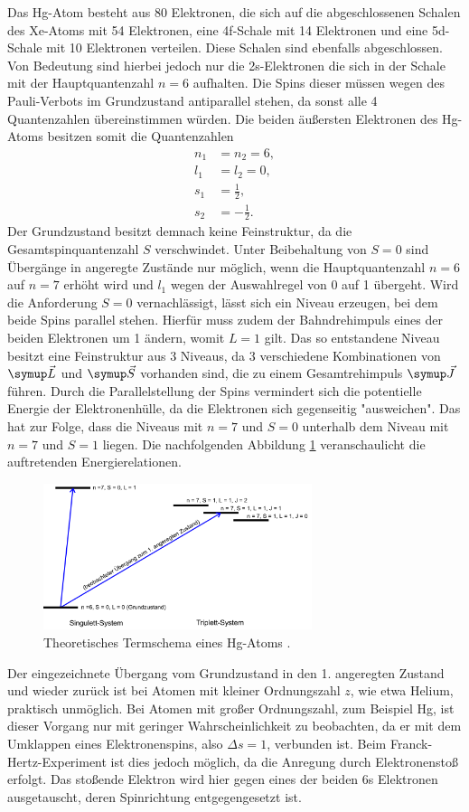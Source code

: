 Das Hg-Atom besteht aus 80 Elektronen, die sich auf die abgeschlossenen Schalen
des Xe-Atoms mit 54 Elektronen, eine 4f-Schale mit 14 Elektronen und eine
5d-Schale mit 10 Elektronen verteilen. Diese Schalen sind ebenfalls abgeschlossen. Von Bedeutung
sind hierbei jedoch nur die 2s-Elektronen die sich in der Schale mit der
Hauptquantenzahl $n=6$ aufhalten. Die Spins dieser müssen wegen des
Pauli-Verbots im Grundzustand antiparallel stehen, da sonst alle 4
Quantenzahlen übereinstimmen würden.
Die beiden äußersten Elektronen des Hg-Atoms besitzen somit die
Quantenzahlen
\begin{align*}
  n_1 &= n_2 = 6, \\
  l_1 &= l_2 = 0, \\
  s_1 &= \frac{1}{2}, \\
  s_2 &= - \frac{1}{2}.
\end{align*}
Der Grundzustand besitzt demnach keine Feinstruktur, da die Gesamtspinquantenzahl
$S$ verschwindet. Unter Beibehaltung von $S=0$ sind Übergänge in angeregte
Zustände nur möglich, wenn die Hauptquantenzahl $n=6$ auf $n=7$ erhöht wird
und $l_1$ wegen der Auswahlregel von 0 auf 1 übergeht. Wird die Anforderung
$S=0$ vernachlässigt, lässt sich ein Niveau erzeugen, bei dem beide Spins
parallel stehen. Hierfür muss zudem der Bahndrehimpuls eines der beiden
Elektronen um 1 ändern, womit $L=1$ gilt. Das so entstandene Niveau besitzt
eine Feinstruktur aus 3 Niveaus, da 3 verschiedene Kombinationen von
$\su{\vec{L}}$ und $\su{\vec{S}}$ vorhanden sind, die zu einem Gesamtrehimpuls
$\su{\vec{J}}$ führen. Durch die Parallelstellung der Spins vermindert sich
die potentielle Energie der Elektronenhülle, da die Elektronen sich gegenseitig
"ausweichen". Das hat zur Folge, dass die Niveaus mit $n=7$ und $S=0$ unterhalb
dem Niveau mit $n=7$ und $S=1$ liegen. Die nachfolgenden Abbildung \ref{fig:termschema}
veranschaulicht die auftretenden Energierelationen.
\begin{figure}
  \centering
  \includegraphics[width=0.7\textwidth]{bilder/term.jpg}
  \caption{Theoretisches Termschema eines Hg-Atoms \cite{601}.}
  \label{fig:termschema}
\end{figure}
Der eingezeichnete Übergang vom Grundzustand in den 1. angeregten Zustand und
wieder zurück ist bei Atomen mit kleiner Ordnungszahl $z$, wie etwa Helium,
praktisch unmöglich. Bei Atomen mit großer Ordnungszahl, zum Beispiel Hg, ist
dieser Vorgang nur mit geringer Wahrscheinlichkeit zu beobachten, da er mit dem
Umklappen  eines Elektronenspins, also $\Delta s=1$, verbunden ist. Beim
Franck-Hertz-Experiment ist dies jedoch möglich, da die Anregung durch
Elektronenstoß erfolgt. Das stoßende Elektron wird hier gegen eines der beiden
6s Elektronen ausgetauscht, deren Spinrichtung entgegengesetzt ist.
